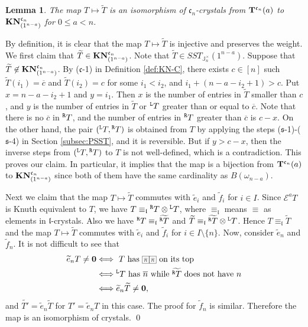 \documentclass[leqno,11pt]{amsart}
\newtheorem{lem}[thm]{\bf Lemma}
\numberwithin{equation}{section}
\newcommand{\pf}{\noindent{\bfseries Proof. }}
\newcommand{\ov}{\overline}
\newcommand{\te}{\widetilde{e}}
\newcommand{\tf}{\widetilde{f}}
\newcommand{\td}{\widetilde}
\newcommand{\mc}{\mathcal}
\newcommand{\mf}{\mathfrak}
\newcommand{\J}{\mathbb{J}}
\begin{document}
\begin{lem}\label{lem:psst_to_KN_C} The map $T \longmapsto \td{T}$ is an isomorphism of $\mf c_n$-crystals from ${\bf T}^{\mf c_n}(a)$ to ${\bf KN}^{\mf c_n}_{(1^{n-a})}$ for $0\leq a< n$.
\end{lem}
\pf By definition, it is clear that the map $T\longmapsto \td{T}$ is injective and preserves the weight. We first claim that $\td{T}\in {\bf KN}^{\mf c_n}_{(1^{n-a})}$. Note that $\td{T}\in SST_{\J_n^\times}(1^{n-a})$. Suppose that $\td{T}\not\in {\bf KN}^{\mf c_n}_{(1^{n-a})}$. By ($\mf c$-1) in Definition \ref{def:KN-C}, there exists $c\in [n]$ such $\td{T}(i_1)=\ov{c}$ and $\td{T}(i_2)=c$ for some $i_1<i_2$, and $i_1+(n-a-i_2+1)>c$. Put $x=n-a-i_2+1$ and $y=i_1$. Then $x$ is the number of entries in $\td{T}$ smaller than $c$, and $y$ is the number of entries in $\td{T}$ or ${}^{\tt L}T$ greater than or equal to $\ov{c}$. Note that there is no $\ov{c}$ in ${}^{\tt R}T$, and the number of entries in ${}^{\tt R}T$ greater than $\ov{c}$ is $c-x$. On the other hand, the pair $({}^{\tt L}T,{}^{\tt R}T)$ is obtained from $T$ by applying the steps ($\mf s$-1)-($\mf s$-4) in Section \ref{subsec:PSST}, and it is reversible. But if $y>c-x$, then the inverse steps from $({}^{\tt L}T,{}^{\tt R}T)$ to $T$ is not well-defined, which is a contradiction. This proves our claim. In particular, it implies that the map is a bijection from ${\bf T}^{\mf c_n}(a)$ to ${\bf KN}^{\mf c_n}_{(1^{n-a})}$ since both of them have the same cardinality as $B(\omega_{n-a})$. 

Next we claim that the map $T\longmapsto \td{T}$ commutes with $\te_i$ and $\tf_i$ for $i\in I$. Since ${\mc E}^a T$ is Knuth equivalent to $T$, we have $T\equiv_{\mf l} {}^{\tt R}T\otimes {}^{\tt L}T$, where $\equiv_{\mf l}$ means $\equiv$ as elements in $\mf l$-crystals. Also we have ${}^{\tt R}T\equiv_{\mf l} \td{{}^{\tt R}T}$ and $\td{T}\equiv_{\mf l} \td{{}^{\tt R}T}\otimes {}^{\tt L}T$. Hence $T\equiv_{\mf l} \td{T}$ and the map $T\longmapsto \td{T}$ commutes with $\te_i$ and $\tf_i$ for $i\in I\setminus\{n\}$. Now, consider $\te_n$ and $\tf_n$. It is not difficult to see that
\begin{equation*}
\begin{split}
\te_n T\neq {\bf 0}& \Longleftrightarrow \text{
$T$ has $\resizebox{.05\hsize}{!}{\def\lr#1{\multicolumn{1}{|@{\hspace{.6ex}}c@{\hspace{.6ex}}|}{\raisebox{-.25ex}{$#1$}}}\raisebox{-.65ex}
{$\begin{array}[b]{cc}
\cline{1-1}\cline{2-2}
\lr{\ov{n}}&\lr{\ov{n}}\\
\cline{1-1}\cline{2-2}
\end{array}$}}$ on its top
}\\
& \Longleftrightarrow \text{${}^{\tt L}T$ has $\ov{n}$ while $\td{{}^{\tt R}T}$ does not have $n$}\\
& \Longleftrightarrow \te_n \td{T}\neq {\bf 0},
\end{split}
\end{equation*}
and $\td{T'}=\te_n\td{T}$ for $T'=\td{e}_n T$ in this case. The proof for $\tf_n$ is similar. 
Therefore the map is an isomorphism of crystals.
\qed
\end{document}

